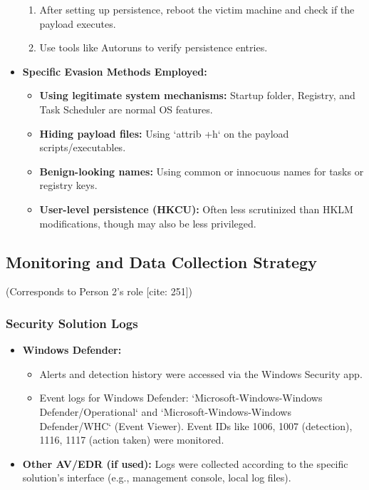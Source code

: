 \documentclass[11pt]{article}
\begin{document}
\begin{itemize}
\begin{enumerate}
			\item After setting up persistence, reboot the victim machine and check if the payload executes.
			\item Use tools like Autoruns to verify persistence entries.
		\end{enumerate}
		\item \textbf{Specific Evasion Methods Employed:}
		\begin{itemize}
			\item \textbf{Using legitimate system mechanisms:} Startup folder, Registry, and Task Scheduler are normal OS features.
			\item \textbf{Hiding payload files:} Using `attrib +h` on the payload scripts/executables.
			\item \textbf{Benign-looking names:} Using common or innocuous names for tasks or registry keys.
			\item \textbf{User-level persistence (HKCU):} Often less scrutinized than HKLM modifications, though may also be less privileged.
		\end{itemize}
	\end{itemize}
	
	
	\subsection{Monitoring and Data Collection Strategy}
	(Corresponds to Person 2's role [cite: 251])
	\subsubsection{Security Solution Logs}
	\begin{itemize}
		\item \textbf{Windows Defender:}
		\begin{itemize}
			\item Alerts and detection history were accessed via the Windows Security app.
			\item Event logs for Windows Defender: `Microsoft-Windows-Windows Defender/Operational` and `Microsoft-Windows-Windows Defender/WHC` (Event Viewer). Event IDs like 1006, 1007 (detection), 1116, 1117 (action taken) were monitored.
		\end{itemize}
		\item \textbf{Other AV/EDR (if used):} Logs were collected according to the specific solution's interface (e.g., management console, local log files).
	\end{itemize}
	
\end{document}

